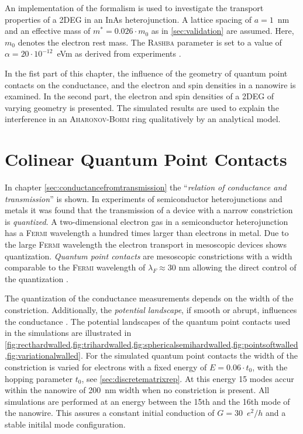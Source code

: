 An implementation of the \gfnc{} formalism is used to investigate the transport properties of a 2DEG in an InAs heterojunction. A lattice spacing of $a=1$~nm and an effective mass of $m^*=0.026 \cdot m_0$ as in \cref{sec:validation} are assumed. Here, $m_0$ denotes the electron rest mass. The \textsc{Rashba} parameter is set to a value of $\alpha = 20 \cdot 10^{-12}$~eVm as derived from experiments \cite{Jacob2009Thesis}.\par
In the fist part of this chapter, the influence of the geometry of quantum point contacts on the conductance, and the electron and spin densities in a nanowire is examined. In the second part, the electron and spin densities of a 2DEG of varying geometry is presented. The simulated results are used to explain the interference in an \textsc{Aharonov-Bohm} ring qualitatively by an analytical model.
\section{Colinear Quantum Point Contacts}
In chapter \ref{sec:conductancefromtransmission} the ``\emph{relation of conductance and transmission}'' \cite{landauer1996} is shown. In experiments of semiconductor heterojunctions \cite{vanHoutenBeenakker2005} and metals \cite{PhysRevB.36.1284} it was found that the transmission of a device with a narrow constriction is \emph{quantized}. A two-dimensional electron gas in a semiconductor heterojunction has a \textsc{Fermi} wavelength a hundred times larger than electrons in metal. Due to the large \textsc{Fermi} wavelength the electron transport in mesoscopic devices shows quantization. \emph{Quantum point contacts} are mesoscopic constrictions with a width comparable to the \textsc{Fermi} wavelength of $\lambda_F \approx 30\text{~nm}$ allowing the direct control of the quantization \cite{vanHoutenBeenakker2005}.\par
The quantization of the conductance measurements depends on the width of the constriction. Additionally, the \emph{potential landscape}, if smooth or abrupt, influences the conductance \cite{PhysRevB.44.8017}. The potential landscapes of the quantum point contacts used in the simulations are illustrated in \cref{fig:recthardwalled,fig:trihardwalled,fig:sphericalsemihardwalled,fig:pointsoftwalled,fig:variationalwalled}.
For the simulated quantum point contacts the width of the constriction is varied for electrons with a fixed energy of $E=0.06\cdot t_0$, with the hopping parameter $t_0$, see \cref{sec:discretematrixrep}. At this energy 15 modes accur within the nanowire of 200~nm width when no constriction is present. All simulations are performed at an energy between the 15th and the 16th mode of the nanowire. This assures a constant initial conduction of $G =30$~$e^2/h$ and a stable initilal mode configuration.
